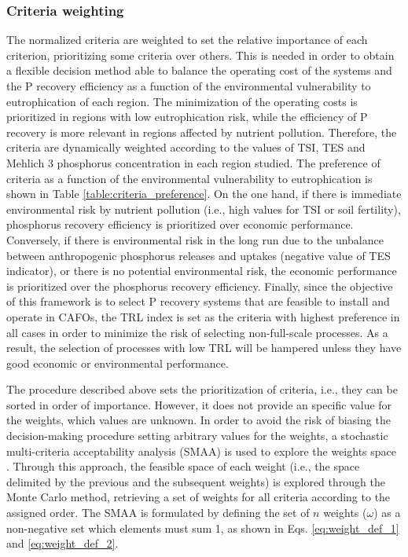 \begin{refsection}[referencesCh4]
\subsubsection{Criteria weighting}
The normalized criteria are weighted to set the relative importance of each criterion, prioritizing some criteria over others. This is needed in order to obtain a flexible decision method able to balance the operating cost of the systems and the P recovery efficiency as a function of the environmental vulnerability to eutrophication of each region. The minimization of the operating costs is prioritized in regions with low eutrophication risk, while the efficiency of P recovery is more relevant in regions affected by nutrient pollution. Therefore, the criteria are dynamically weighted according to the values of TSI, TES and Mehlich 3 phosphorus concentration in each region studied. The preference of criteria as a function of the environmental vulnerability to eutrophication is shown in Table \ref{table:criteria_preference}. On the one hand, if there is immediate environmental risk by nutrient pollution (i.e., high values for TSI or soil fertility), phosphorus recovery efficiency is prioritized over economic performance. Conversely, if there is environmental risk in the long run due to the unbalance between anthropogenic phosphorus releases and uptakes (negative value of TES indicator), or there is no potential environmental risk, the economic performance is prioritized over the phosphorus recovery efficiency. 
Finally, since the objective of this framework is to select P recovery systems that are feasible to install and operate in CAFOs, the TRL index is set as the criteria with highest preference in all cases in order to minimize the risk of selecting non-full-scale processes. As a result, the selection of processes with low TRL will be hampered unless they have good economic or environmental performance.

The procedure described above sets the prioritization of criteria, i.e., they can be sorted in order of importance. However, it does not provide an specific value for the weights, which values are unknown. In order to avoid the risk of biasing the decision-making procedure setting arbitrary values for the weights, a stochastic multi-criteria acceptability analysis (SMAA) is used to explore the weights space \citep{tervonen_implementing_2007}. Through this approach, the feasible space of each weight (i.e., the space delimited by the previous and the subsequent weights) is explored through the Monte Carlo method, retrieving a set of weights for all criteria according to the assigned order. The SMAA is formulated by defining the set of $n$ weights ($\omega$) as a non-negative set which elements must sum 1, as shown in Eqs. \ref{eq:weight_def_1} and \ref{eq:weight_def_2}.


\end{refsection}
